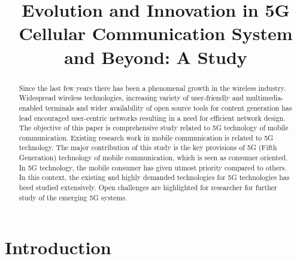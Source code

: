 \documentclass[conference]{IEEEtran}
\begin{document}
\title{Evolution and Innovation in 5G Cellular Communication
System and Beyond: A Study
}


\author{
}













\maketitle


\begin{abstract}
Since the last few years there has been a phenomenal growth in the wireless industry. Widespread wireless technologies,
increasing variety of user-friendly and multimedia-enabled terminals and wider availability of open source tools for content generation has lead encouraged user-centric networks resulting in a need for efficient network design. The objective of this paper is comprehensive study related to 5G technology of mobile communication. Existing research work in mobile communication is related to 5G technology. The major contribution of this study is the key provisions of 5G (Fifth Generation) technology of mobile communication, which is seen as consumer oriented. In 5G technology, the mobile consumer has given utmost priority compared to others. In this context, the existing and highly demanded technologies for 5G technologies has beed studied extensively. Open challenges are highlighted for researcher for further study of the emerging 5G systems.
\end{abstract}


\section{Introduction}
\end{document}
